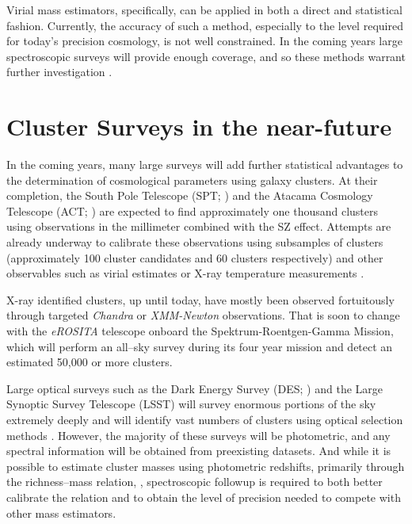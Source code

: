 Virial mass estimators, specifically, can be applied in both a direct and statistical fashion. Currently, the accuracy of such a method, especially to the level required for today's precision cosmology, is not well constrained. In the coming years large spectroscopic surveys will provide enough coverage, and so these methods warrant further investigation .

\section{Cluster Surveys in the near-future}
In the coming years, many large surveys will add further statistical advantages to the determination of cosmological parameters using galaxy clusters. At their completion, the South Pole Telescope (SPT; \citealt{Carlstrom2011}) and the Atacama Cosmology Telescope (ACT; \citealt{Swetz2011}) are expected to find approximately one thousand clusters using observations in the millimeter combined with the SZ effect. Attempts are already underway to calibrate these observations using subsamples of clusters (approximately 100 cluster candidates and 60 clusters respectively) and other observables such as virial estimates or X-ray temperature measurements . 

X-ray identified clusters, up until today, have mostly been observed fortuitously through targeted \textit{Chandra} or \textit{XMM-Newton} observations. That is soon to change with the \textit{eROSITA} telescope onboard the Spektrum-Roentgen-Gamma Mission, which will perform an all--sky survey during its four year mission and detect an estimated 50,000 or more clusters.

Large optical surveys such as the Dark Energy Survey (DES; \citealt{DES2005}) and the Large Synoptic Survey Telescope (LSST) will survey enormous portions of the sky extremely deeply and will identify vast numbers of clusters using optical selection methods . However, the majority of these surveys will be photometric, and any spectral information will be obtained from preexisting datasets. And while it is possible to estimate cluster masses using photometric redshifts, primarily through the richness--mass relation, , spectroscopic followup is required to both better calibrate the relation and to obtain the level of precision needed to compete with other mass estimators. 

